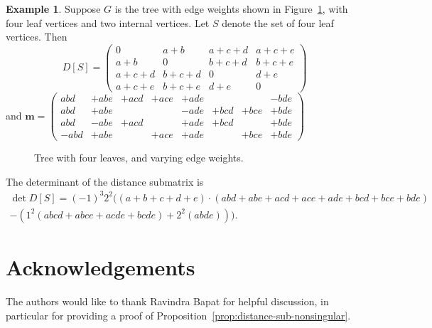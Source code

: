 \documentclass{amsart}
\theoremstyle{definition}
\newtheorem{eg}[thm]{Example}
\newcommand{\boldm}{\mathbf{m}}
\begin{document}
\begin{eg}
Suppose $G$ is the tree with edge weights shown in Figure~\ref{fig:tree-4}, with four leaf vertices and two internal vertices.
Let $S$ denote the set of four leaf vertices.
Then
\[
	D[S] = \begin{pmatrix}
	0 & a + b & a + c + d & a + c + e \\
	a + b & 0 & b + c + d & b + c + e \\
	a + c + d & b + c + d & 0 & d + e \\
	a + c + e & b + c + e & d + e & 0
	\end{pmatrix}
\]
and 
$\boldm = 
\begin{pmatrix}
abd & + abe & + acd & + ace & + ade & & & - bde \\
abd & + abe & & &  - ade & + bcd & + bce & + bde \\
abd & - abe & + acd & & + ade & + bcd & & + bde \\
-abd & + abe & & + ace & + ade & & + bce & + bde
\end{pmatrix}
$
\begin{figure}[h]
\centering
{}
\caption{Tree with four leaves, and varying edge weights.}
\label{fig:tree-4}
\end{figure}

The determinant of the distance submatrix is
\[
	\begin{gathered}
	\det D[S] 
	= (-1)^3 2^2 \Big( (a + b + c + d + e) \cdot (abd + abe + acd + ace + ade + bcd + bce + bde) \\
	- (1^2(abcd + abce + acde + bcde) + 2^2 (abde)) \Big).
	\end{gathered}
\]
\end{eg}


\section*{Acknowledgements}
The authors would like to thank Ravindra Bapat for helpful discussion,
in particular for providing a proof of Proposition~\ref{prop:distance-sub-nonsingular}.


 

\end{document}
